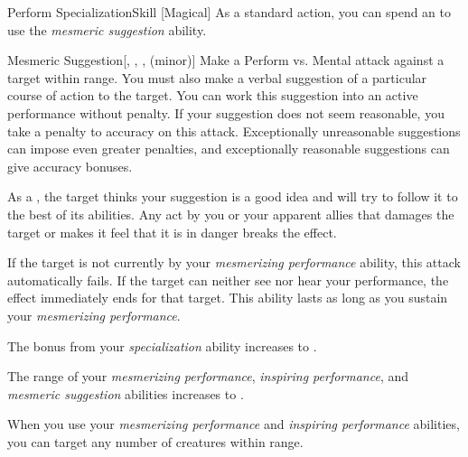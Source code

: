 \begin{feat}{Perform Specialization}{Skill}
        [Magical] As a standard action, you can spend an  to use the \textit{mesmeric suggestion} ability.
        \begin{ability}{Mesmeric Suggestion}[, , ,  (minor)]
            Make a Perform vs. Mental attack against a target within \rngmed range.
            You must also make a verbal suggestion of a particular course of action to the target.
            You can work this suggestion into an active performance without penalty.
            If your suggestion does not seem reasonable, you take a  penalty to accuracy on this attack.
            Exceptionally unreasonable suggestions can impose even greater penalties, and exceptionally reasonable suggestions can give accuracy bonuses.

            \hit As a , the target thinks your suggestion is a good idea and will try to follow it to the best of its abilities.
            Any act by you or your apparent allies that damages the target or makes it feel that it is in danger breaks the effect.

            If the target is not currently \fascinated by your \textit{mesmerizing performance} ability, this attack automatically fails.
            If the target can neither see nor hear your performance, the effect immediately ends for that target.
            This ability lasts as long as you sustain your \textit{mesmerizing performance}.
        \end{ability}

         The bonus from your \textit{specialization} ability increases to .

         The range of your \textit{mesmerizing performance}, \textit{inspiring performance}, and \textit{mesmeric suggestion} abilities increases to \rnglong.

         When you use your \textit{mesmerizing performance} and \textit{inspiring performance} abilities, you can target any number of creatures within range.
    \end{feat}

